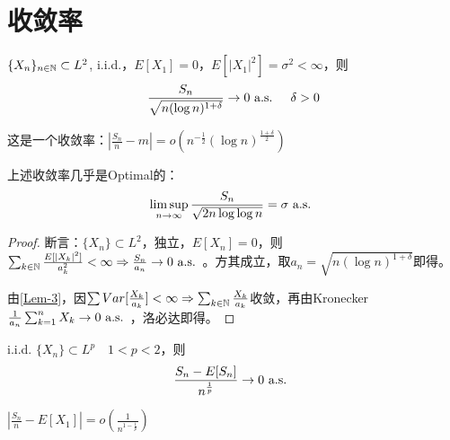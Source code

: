 \documentclass{ctexbook}
\begin{document}
\section{收敛率}
\begin{Prop}
  $\{X_{n}\}_{n\in\mathbb{N}}\subset L^{2}$, i.i.d.，$E[X_{1}]=0$，$E[|X_{1}|^{2}]=\sigma^{2}<\infty$，则
  \[\frac{S_{n}}{\sqrt{n(\log n)^{1+\delta}}}\to 0\text{ a.s. }\quad \delta>0\]
\end{Prop}

\begin{Rmk}
  这是一个收敛率：$|\frac{S_{n}}{n}-m|=o(n^{-\frac 1 2}(\log n)^{\frac{1+\delta}{2}})$
\end{Rmk}

\begin{Rmk}
  上述收敛率几乎是Optimal的：
  \[\limsup_{n\to\infty}\frac{S_{n}}{\sqrt{2n\log\log n}}=\sigma \text{ a.s. }\]
\end{Rmk}

\begin{proof}
  断言：$\{X_{n}\}\subset L^{2}$，独立，$E[X_{n}]=0$，则$\sum_{k\in \mathbb{N}}\frac{E[|X_{k}|^{2}]}{a_{k}^{2}}<\infty\Rightarrow \frac{S_{n}}{a_{n}}\to 0\text{ a.s. }$。方其成立，取$a_{n}=\sqrt{n(\log n)^{1+\delta}}$即得。

  由\ref{Lem-3}，因$\sum Var[\frac{X_{k}}{a_{k}}]<\infty\Rightarrow \sum_{k\in\mathbb{N}}\frac{X_{k}}{a_{k}}$收敛，再由Kronecker $\frac{1}{a_{n}}\sum_{k=1}^{n}X_{k}\to 0\text{ a.s. }$，洛必达即得。
\end{proof}

\begin{Prop}
  i.i.d. $\{X_{n}\}\subset L^{p}\quad 1<p<2$，则
  \[\frac{S_{n}-E[S_{n}]}{n^{\frac 1 p}}\to 0\text{ a.s. }\]
\end{Prop}

\begin{Rmk}
  $|\frac{S_{n}}{n}-E[X_{1}]|=o(\frac{1}{n^{1-\frac{1}{p}}})$
\end{Rmk}
\end{document}
